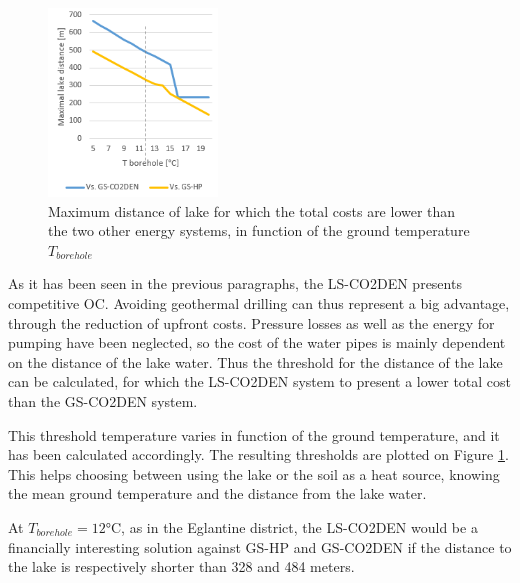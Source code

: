 \documentclass{article}
\begin{document}
\begin{figure} 
	\vspace{-20pt}
	\centering
	\includegraphics[width=0.4\textwidth]{lakeDist.png}
	\caption{Maximum distance of lake for which the total costs are lower than the two other energy systems, in function of the ground temperature $T_{borehole}$}
	\label{fig:lakeDist}
	\vspace{-10pt}
\end{figure}

As it has been seen in the previous paragraphs, the LS-CO2DEN presents competitive OC. Avoiding geothermal drilling can thus represent a big advantage, through the reduction of upfront costs. Pressure losses as well as the energy for pumping have been neglected, so the cost of the water pipes is mainly dependent on the distance of the lake water. Thus the threshold for the distance of the lake can be calculated, for which the LS-CO2DEN system to present a lower total cost than the GS-CO2DEN system. 

This threshold temperature varies in function of the ground temperature, and it has been calculated accordingly. The resulting thresholds are plotted on Figure \ref{fig:lakeDist}. This helps choosing between using the lake or the soil as a heat source, knowing the mean ground temperature and the distance from the lake water.


At $T_{borehole} = 12 \si{\celsius}$, as in the Eglantine district, the LS-CO2DEN would be a financially interesting solution against  GS-HP and GS-CO2DEN if the distance to the lake is respectively shorter than 328 and 484 meters.
\end{document}
